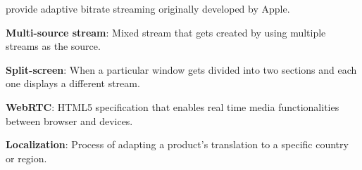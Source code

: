\begin{packed_dict}
	provide adaptive bitrate streaming originally developed by Apple.
	\item \textbf{Multi-source stream}: Mixed stream that gets created 
	by using multiple streams as the source.
	\item \textbf{Split-screen}: When a particular window gets divided into 
	two sections and each one displays a different stream.
	\item \textbf{WebRTC}: HTML5 specification that enables real time media 
	functionalities between browser and devices.
	\item \textbf{Localization}: Process of adapting a product's translation 
	to a specific country or region. 
\end{packed_dict}





















